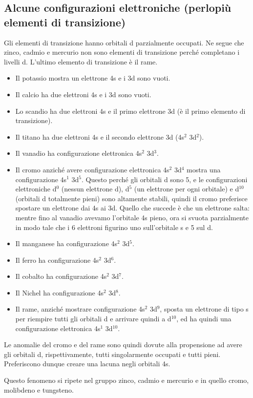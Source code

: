 \subsection{Alcune configurazioni elettroniche (perlopiù elementi di transizione)}
Gli elementi di transizione hanno orbitali d parzialmente occupati. Ne segue che zinco, cadmio e mercurio non sono elementi di transizione perché completano i livelli d. L'ultimo elemento di transizione è il rame.
\begin{itemize}
  \item Il potassio mostra un elettrone 4s e i 3d sono vuoti.
  \item Il calcio ha due elettroni 4s e i 3d sono vuoti.
  \item Lo scandio ha due elettroni 4s e il primo elettrone 3d (è il primo elemento di transizione).
  \item Il titano ha due elettroni 4s e il secondo elettrone 3d (4s$^2$ 3d$^2$).
  \item Il vanadio ha configurazione elettronica 4s$^2$ 3d$^3$.
  \item Il cromo anziché avere configurazione elettronica 4s$^2$ 3d$^4$ mostra una configurazione 4s$^1$ 3d$^5$. Questo perché gli orbitali d sono 5, e le configurazioni elettroniche d$^0$ (nessun elettrone d), d$^5$ (un elettrone per ogni orbitale) e d$^{10}$ (orbitali d totalmente pieni) sono altamente stabili, quindi il cromo preferisce spostare un elettrone dai 4s ai 3d. Quello che succede è che un elettrone salta: mentre fino al vanadio avevamo l'orbitale 4s pieno, ora si svuota parzialmente in modo tale che i 6 elettroni figurino uno sull'orbitale s e 5 sul d.
  \item Il manganese ha configurazione 4s$^2$ 3d$^5$.
  \item Il ferro ha configurazione 4s$^2$ 3d$^6$.
  \item Il cobalto ha configurazione 4s$^2$ 3d$^7$.
  \item Il Nichel ha configurazione 4s$^2$ 3d$^8$.
  \item Il rame, anziché mostrare configurazione 4s$^2$ 3d$^9$, sposta un elettrone di tipo s per riempire tutti gli orbitali d e arrivare quindi a d$^{10}$, ed ha quindi una configurazione elettronica 4s$^1$ 3d$^{10}$.
\end{itemize}
Le anomalie del cromo e del rame sono quindi dovute alla propensione ad avere gli orbitali d, rispettivamente, tutti singolarmente occupati e tutti pieni. Preferiscono dunque creare una lacuna negli orbitali 4s.

Questo fenomeno si ripete nel gruppo zinco, cadmio e mercurio e in quello cromo, molibdeno e tungsteno.